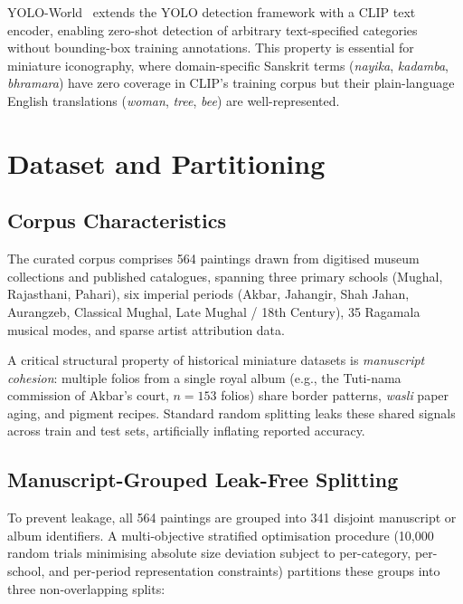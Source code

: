 \documentclass[12pt, a4paper, twoside]{article}
\begin{document}
YOLO-World~\cite{cheng2024yoloworld} extends the YOLO detection framework with a CLIP text encoder, enabling zero-shot detection of arbitrary text-specified categories without bounding-box training annotations. This property is essential for miniature iconography, where domain-specific Sanskrit terms (\textit{nayika}, \textit{kadamba}, \textit{bhramara}) have zero coverage in CLIP's training corpus but their plain-language English translations (\textit{woman}, \textit{tree}, \textit{bee}) are well-represented.

\section{Dataset and Partitioning}
\label{sec:data}

\subsection{Corpus Characteristics}

The curated corpus comprises 564 paintings drawn from digitised museum collections and published catalogues, spanning three primary schools (Mughal, Rajasthani, Pahari), six imperial periods (Akbar, Jahangir, Shah Jahan, Aurangzeb, Classical Mughal, Late Mughal / 18th Century), 35 Ragamala musical modes, and sparse artist attribution data.

A critical structural property of historical miniature datasets is \emph{manuscript cohesion}: multiple folios from a single royal album (e.g., the Tuti-nama commission of Akbar's court, $n = 153$ folios) share border patterns, \textit{wasli} paper aging, and pigment recipes. Standard random splitting leaks these shared signals across train and test sets, artificially inflating reported accuracy.

\subsection{Manuscript-Grouped Leak-Free Splitting}

To prevent leakage, all 564 paintings are grouped into 341 disjoint manuscript or album identifiers. A multi-objective stratified optimisation procedure (10,000 random trials minimising absolute size deviation subject to per-category, per-school, and per-period representation constraints) partitions these groups into three non-overlapping splits:
\end{document}
